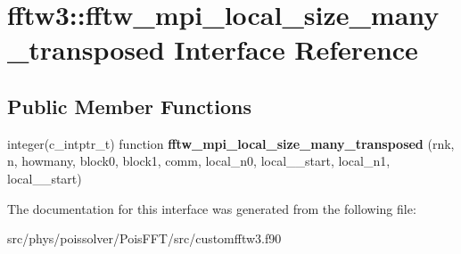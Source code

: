 \hypertarget{interfacefftw3_1_1fftw__mpi__local__size__many__transposed}{}\section{fftw3\+:\+:fftw\+\_\+mpi\+\_\+local\+\_\+size\+\_\+many\+\_\+transposed Interface Reference}
\label{interfacefftw3_1_1fftw__mpi__local__size__many__transposed}
\subsection*{Public Member Functions}
\begin{DoxyCompactItemize}
\item 
integer(c\+\_\+intptr\+\_\+t) function {\bfseries fftw\+\_\+mpi\+\_\+local\+\_\+size\+\_\+many\+\_\+transposed} (rnk, n, howmany, block0, block1, comm, local\+\_\+n0, local\+\_\+\_\+start, local\+\_\+n1, local\+\_\+\_\+start)\hypertarget{interfacefftw3_1_1fftw__mpi__local__size__many__transposed_ae1e8339da024d331c7a458ff352b0e3e}{}\label{interfacefftw3_1_1fftw__mpi__local__size__many__transposed_ae1e8339da024d331c7a458ff352b0e3e}

\end{DoxyCompactItemize}


The documentation for this interface was generated from the following file\+:\begin{DoxyCompactItemize}
\item 
src/phys/poissolver/\+Pois\+F\+F\+T/src/customfftw3.\+f90\end{DoxyCompactItemize}
